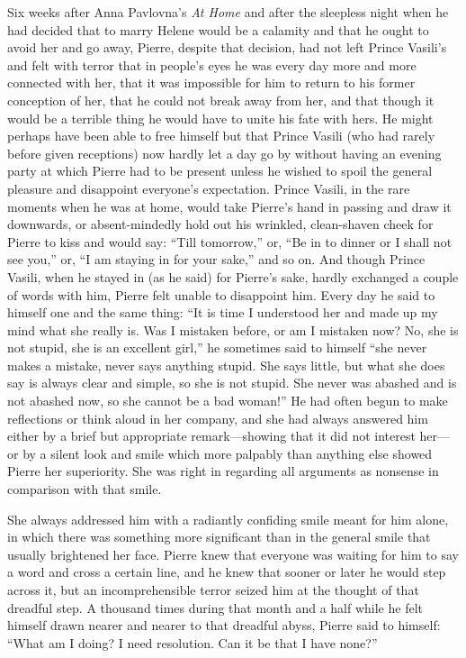 Six weeks after Anna Pavlovna's \emph{At Home} and after the
sleepless night when he had decided that to marry Helene would be
a calamity and that he ought to avoid her and go away, Pierre,
despite that decision, had not left Prince Vasili's and felt with
terror that in people's eyes he was every day more and more
connected with her, that it was impossible for him to return to
his former conception of her, that he could not break away from
her, and that though it would be a terrible thing he would have
to unite his fate with hers. He might perhaps have been able to
free himself but that Prince Vasili (who had rarely before given
receptions) now hardly let a day go by without having an evening
party at which Pierre had to be present unless he wished to spoil
the general pleasure and disappoint everyone's
expectation. Prince Vasili, in the rare moments when he was at
home, would take Pierre's hand in passing and draw it downwards,
or absent-mindedly hold out his wrinkled, clean-shaven cheek for
Pierre to kiss and would say: ``Till tomorrow,'' or, ``Be in to
dinner or I shall not see you,'' or, ``I am staying in for your
sake,'' and so on. And though Prince Vasili, when he stayed in
(as he said) for Pierre's sake, hardly exchanged a couple of
words with him, Pierre felt unable to disappoint him. Every day
he said to himself one and the same thing: ``It is time I
understood her and made up my mind what she really is. Was I
mistaken before, or am I mistaken now? No, she is not stupid, she
is an excellent girl,'' he sometimes said to himself ``she never
makes a mistake, never says anything stupid. She says little, but
what she does say is always clear and simple, so she is not
stupid.  She never was abashed and is not abashed now, so she
cannot be a bad woman!'' He had often begun to make reflections
or think aloud in her company, and she had always answered him
either by a brief but appropriate remark---showing that it did
not interest her---or by a silent look and smile which more
palpably than anything else showed Pierre her superiority. She
was right in regarding all arguments as nonsense in comparison
with that smile.

She always addressed him with a radiantly confiding smile meant
for him alone, in which there was something more significant than
in the general smile that usually brightened her face. Pierre
knew that everyone was waiting for him to say a word and cross a
certain line, and he knew that sooner or later he would step
across it, but an incomprehensible terror seized him at the
thought of that dreadful step. A thousand times during that month
and a half while he felt himself drawn nearer and nearer to that
dreadful abyss, Pierre said to himself: ``What am I doing? I need
resolution. Can it be that I have none?''

